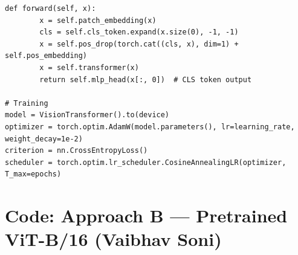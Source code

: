 \documentclass[10pt,twocolumn,letterpaper]{article}
\begin{document}
\begin{lstlisting}[caption={From-scratch ViT implementation.}]
    def forward(self, x):
        x = self.patch_embedding(x)
        cls = self.cls_token.expand(x.size(0), -1, -1)
        x = self.pos_drop(torch.cat((cls, x), dim=1) + self.pos_embedding)
        x = self.transformer(x)
        return self.mlp_head(x[:, 0])  # CLS token output

# Training
model = VisionTransformer().to(device)
optimizer = torch.optim.AdamW(model.parameters(), lr=learning_rate, weight_decay=1e-2)
criterion = nn.CrossEntropyLoss()
scheduler = torch.optim.lr_scheduler.CosineAnnealingLR(optimizer, T_max=epochs)
\end{lstlisting}


\section{Code: Approach B --- Pretrained ViT-B/16 (Vaibhav Soni)}
\end{document}
